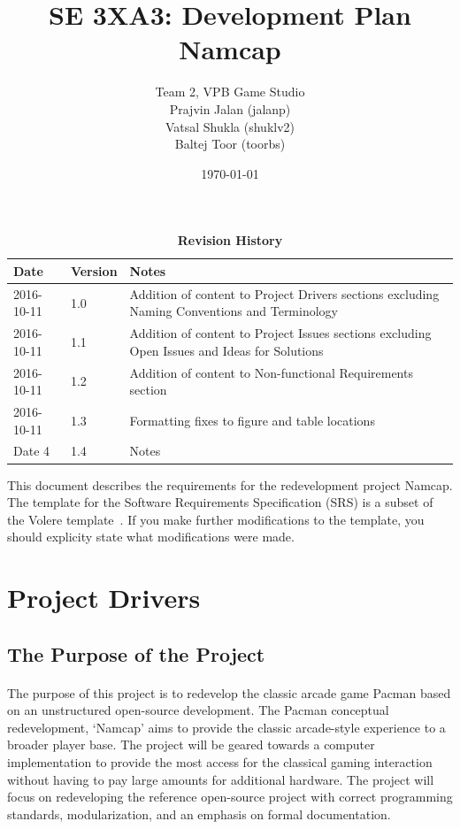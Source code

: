 \documentclass[12pt, titlepage]{article}
\title{SE 3XA3: Development Plan\\Namcap}
\author{Team 2, VPB Game Studio
		\\ Prajvin Jalan (jalanp)
		\\ Vatsal Shukla (shuklv2)
		\\ Baltej Toor (toorbs)
}
\date{\today}
\begin{document}
\maketitle

\tableofcontents
\listoftables
\listoffigures

\newpage

\begin{table}[H]
\caption{\bf Revision History}
\begin{tabularx}{\textwidth}{p{3cm}p{2cm}X}
\toprule {\bf Date} & {\bf Version} & {\bf Notes}\\
\midrule
2016-10-11 & 1.0 & Addition of content to Project Drivers sections excluding Naming Conventions and Terminology\\
2016-10-11 & 1.1 & Addition of content to Project Issues sections excluding Open Issues and Ideas for Solutions\\
2016-10-11 & 1.2 & Addition of content to Non-functional Requirements section\\
2016-10-11 & 1.3 & Formatting fixes to figure and table locations\\
Date 4 & 1.4 & Notes\\
\bottomrule
\end{tabularx}
\end{table}

\newpage


This document describes the requirements for the redevelopment project Namcap.  The template for the Software
Requirements Specification (SRS) is a subset of the Volere
template~\citep{RobertsonAndRobertson2012}.  If you make further modifications
to the template, you should explicity state what modifications were made.

\section{Project Drivers}

\subsection{The Purpose of the Project}
\paragraph{}
The purpose of this project is to redevelop the classic arcade game Pacman based on an unstructured open-source development. The Pacman conceptual redevelopment, ‘Namcap’ aims to provide the classic arcade-style experience to a broader player base. The project will be geared towards a computer implementation to provide the most access for the classical gaming interaction without having to pay large amounts for additional hardware. The project will focus on redeveloping the reference open-source project with correct programming standards, modularization, and an emphasis on formal documentation.
\end{document}
